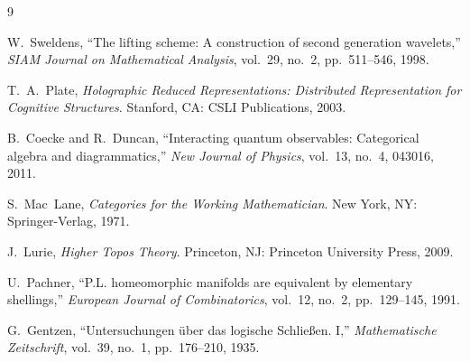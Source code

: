 \documentclass[11pt, a4paper]{article}
\begin{document}
\begin{thebibliography}{9}

W.~Sweldens, ``The lifting scheme: A construction of second generation wavelets,'' \emph{SIAM Journal on Mathematical Analysis}, vol.~29, no.~2, pp.~511--546, 1998.

T.~A.~Plate, \emph{Holographic Reduced Representations: Distributed Representation for Cognitive Structures}. Stanford, CA: CSLI Publications, 2003.

B.~Coecke and R.~Duncan, ``Interacting quantum observables: Categorical algebra and diagrammatics,'' \emph{New Journal of Physics}, vol.~13, no.~4, 043016, 2011.

S.~Mac~Lane, \emph{Categories for the Working Mathematician}. New York, NY: Springer-Verlag, 1971.

J.~Lurie, \emph{Higher Topos Theory}. Princeton, NJ: Princeton University Press, 2009.

U.~Pachner, ``P.L. homeomorphic manifolds are equivalent by elementary shellings,'' \emph{European Journal of Combinatorics}, vol.~12, no.~2, pp.~129--145, 1991.

G.~Gentzen, ``Untersuchungen \"{u}ber das logische Schlie{\ss}en. I,'' \emph{Mathematische Zeitschrift}, vol.~39, no.~1, pp.~176--210, 1935.

\end{thebibliography}
\end{document}

